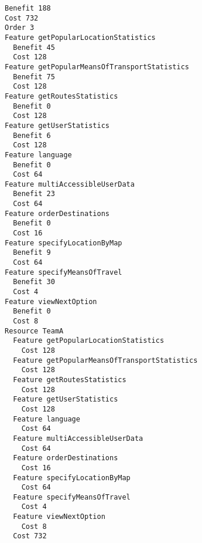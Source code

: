 \begin{lstlisting}
Benefit 188
Cost 732
Order 3
Feature getPopularLocationStatistics
  Benefit 45
  Cost 128
Feature getPopularMeansOfTransportStatistics
  Benefit 75
  Cost 128
Feature getRoutesStatistics
  Benefit 0
  Cost 128
Feature getUserStatistics
  Benefit 6
  Cost 128
Feature language
  Benefit 0
  Cost 64
Feature multiAccessibleUserData
  Benefit 23
  Cost 64
Feature orderDestinations
  Benefit 0
  Cost 16
Feature specifyLocationByMap
  Benefit 9
  Cost 64
Feature specifyMeansOfTravel
  Benefit 30
  Cost 4
Feature viewNextOption
  Benefit 0
  Cost 8
Resource TeamA
  Feature getPopularLocationStatistics
    Cost 128
  Feature getPopularMeansOfTransportStatistics
    Cost 128
  Feature getRoutesStatistics
    Cost 128
  Feature getUserStatistics
    Cost 128
  Feature language
    Cost 64
  Feature multiAccessibleUserData
    Cost 64
  Feature orderDestinations
    Cost 16
  Feature specifyLocationByMap
    Cost 64
  Feature specifyMeansOfTravel
    Cost 4
  Feature viewNextOption
    Cost 8
  Cost 732

\end{lstlisting}